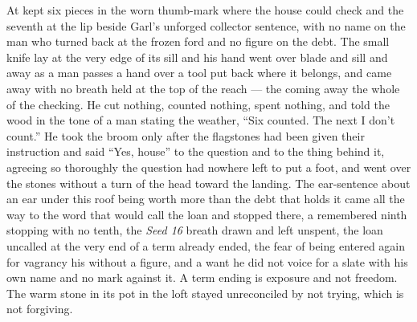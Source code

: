 At   kept six pieces in the worn thumb-mark where the house could check and the seventh at the lip beside Garl's unforged collector sentence, with no name on the man who turned back at the frozen ford and no figure on the debt. The small knife lay at the very edge of its sill and his hand went over blade and sill and away as a man passes a hand over a tool put back where it belongs, and came away with no breath held at the top of the reach --- the coming away the whole of the checking. He cut nothing, counted nothing, spent nothing, and told the wood in the tone of a man stating the weather, “Six counted. The next I don't count.” He took the broom only after the flagstones had been given their instruction and said “Yes, house” to the question and to the thing behind it, agreeing so thoroughly the question had nowhere left to put a foot, and went over the stones without a turn of the head toward the landing. The ear-sentence about an ear under this roof being worth more than the debt that holds it came all the way to the word that would call the loan and stopped there, a remembered ninth stopping with no tenth, the \emph{Seed 16} breath drawn and left unspent, the loan uncalled at the very end of a term already ended, the fear of being entered again for vagrancy his without a figure, and a want he did not voice for a slate with his own name and no mark against it. A term ending is exposure and not freedom. The warm stone in its pot in the loft stayed unreconciled by not trying, which is not forgiving.

